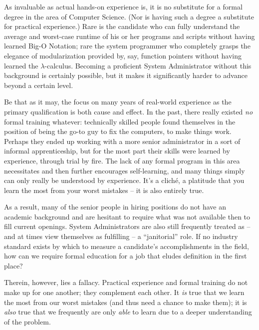 As invaluable as actual hands-on experience is, it is
no substitute for a formal degree in the area of
Computer Science.  (Nor is having such a degree a
substitute for practical experience.) Rare is the
candidate who can fully understand the average and
worst-case runtime of his or her programs and scripts
without having learned Big-O Notation; rare the system
programmer who completely grasps the elegance of
modularization provided by, say, function pointers
without having learned the $\lambda$-calculus.
Becoming a proficient System Administrator without
this background is certainly possible, but it makes it
significantly harder to advance beyond a certain
level.

Be that as it may, the focus on many years of
real-world experience as the primary qualification is
both cause and effect.  In the past, there really
existed {\em no} formal training whatever: technically
skilled people found themselves in the position of
being the go-to guy to fix the computers, to make
things work.  Perhaps they ended up working with a
more senior administrator in a sort of informal
apprenticeship, but for the most part their skills
were learned by experience, through trial by fire.
The lack of any formal program in this area
necessitates and then further encourages
self-learning, and many things simply can only really
be understood by experience.  It's a clich\'{e}, a
platitude that you learn the most from your worst
mistakes -- it is also entirely true.

As a result, many of the senior people in hiring
positions do not have an academic background and are
hesitant to require what was not available then to
fill current openings.  System Administrators are also
still frequently treated as -- and at times view
themselves as fulfilling -- a ``janitorial'' role.  If
no industry standard exists by which to measure a
candidate's accomplishments in the field, how can we
require formal education for a job that eludes
definition in the first place?

Therein, however, lies a fallacy.  Practical
experience and formal training do not make up for one
another; they complement each other.  It {\em is} true
that we learn the most from our worst mistakes (and
thus need a chance to make them); it is {\em also}
true that we frequently are only {\em able} to learn
due to a deeper understanding of the problem.  \\

